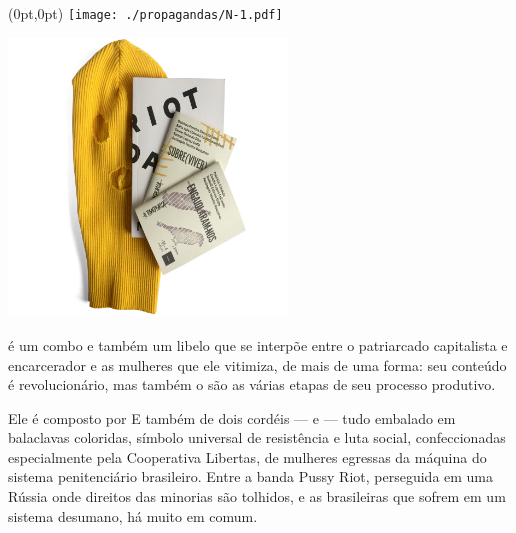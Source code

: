 \pagestyle{n-1}
\label{n-1}

\begin{textblock*}{5.625in}(0pt,0pt)%
\vspace*{-3.5cm}
\hspace*{-2.77cm}\texttt{[image: ./propagandas/N-1.pdf]}
\end{textblock*}

\pagebreak %

\begin{center}
\hspace*{-3.6cm}
\hspace*{3.1cm}\includegraphics[width=74mm]{./grid/riot.jpg}
\end{center}

\hspace*{-7cm}\hrulefill\hspace*{-7cm}

\medskip

 é um combo e também um libelo que se interpõe entre o patriarcado capitalista e encarcerador e as mulheres que ele vitimiza, de mais de uma forma: seu conteúdo é revolucionário, mas também o são as várias etapas de seu processo produtivo.

Ele é composto por 
E também de dois cordéis --- {} e {} --- tudo embalado em balaclavas coloridas, símbolo universal de resistência e luta social, confeccionadas especialmente pela Cooperativa Libertas, de mulheres egressas da máquina do sistema penitenciário brasileiro. Entre a banda Pussy Riot, perseguida em uma Rússia onde direitos das minorias são tolhidos, e as brasileiras que sofrem em um sistema desumano, há muito em comum. 

